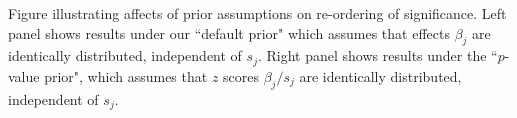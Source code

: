 \label{fig:lfsr_pval} Figure illustrating affects of prior assumptions on re-ordering of significance. Left panel shows results under our ``default prior" which assumes that effects $\beta_j$ are identically distributed, independent of $s_j$. Right panel shows results under the ``$p$-value prior", which assumes that $z$ scores $\beta_j/s_j$ are identically distributed, independent of $s_j$.
